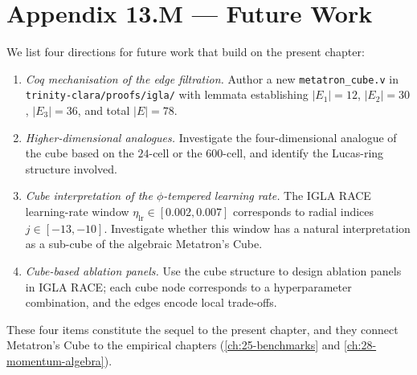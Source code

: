 \section*{Appendix 13.M --- Future Work}
\label{sec:13-appM}

We list four directions for future work that build on the present
chapter:

\begin{enumerate}
\item \emph{Coq mechanisation of the edge filtration.} Author a
  new \verb|metatron_cube.v| in
  \verb|trinity-clara/proofs/igla/| with lemmata establishing
  $|E_{1}| = 12$, $|E_{2}| = 30$, $|E_{3}| = 36$, and total
  $|E| = 78$.
\item \emph{Higher-dimensional analogues.} Investigate the
  four-dimensional analogue of the cube based on the $24$-cell
  or the $600$-cell, and identify the Lucas-ring structure
  involved.
\item \emph{Cube interpretation of the $\phi$-tempered learning
  rate.} The IGLA RACE learning-rate window
  $\eta_{\mathrm{lr}} \in [0.002, 0.007]$ corresponds to radial
  indices $j \in [-13, -10]$. Investigate whether this window
  has a natural interpretation as a sub-cube of the algebraic
  Metatron's Cube.
\item \emph{Cube-based ablation panels.} Use the cube structure
  to design ablation panels in IGLA RACE; each cube node
  corresponds to a hyperparameter combination, and the edges
  encode local trade-offs.
\end{enumerate}

These four items constitute the sequel to the present chapter,
and they connect Metatron's Cube to the empirical chapters
(\ref{ch:25-benchmarks} and \ref{ch:28-momentum-algebra}).

